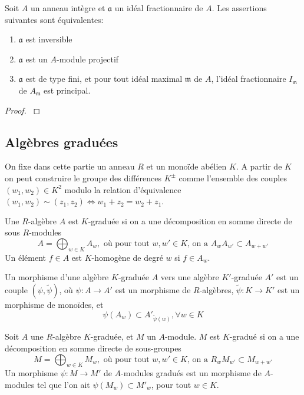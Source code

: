 \begin{thm}\label{ideauxinversibles}
Soit $A$ un anneau intègre et $\mathfrak{a}$ un idéal fractionnaire de $A$. Les assertions suivantes sont équivalentes:
\begin{enumerate}
\item $\mathfrak{a}$ est inversible
\item $\mathfrak{a}$ est un $A$-module projectif
\item $\mathfrak{a}$ est de type fini, et pour tout idéal maximal $\mathfrak{m}$ de $A$, l'idéal fractionnaire $I_\mathfrak{m}$ de $A_\mathfrak{m}$ est principal.
\end{enumerate}
\end{thm}
\begin{proof}
\cite[11.3]{Matsumura}
\end{proof}

\subsection{Algèbres graduées}

On fixe dans cette partie un anneau $R$ et un monoïde abélien $K$. A partir de $K$ on peut construire le groupe des différences $K^{\pm}$ comme l'ensemble des couples $(w_1,w_2)\in K^2$ modulo la relation d'équivalence $(w_1,w_2)\sim (z_1,z_2)\iff w_1+z_2=w_2+z_1$. 

\begin{defn}
Une $R$-algèbre $A$ est $K$-graduée si on a une décomposition en somme directe de sous $R$-modules 
$$A=\bigoplus_{w\in K}A_w,\text{ où pour tout } w,w'\in K\text{, on a }A_wA_{w'}\subset A_{w+w'}$$
Un élément $f\in A$ est $K$-homogène de degré $w$ si $f\in A_w$.

Un morphisme d'une algèbre $K$-graduée $A$ vers une algèbre $K'$-graduée $A'$ est un couple $(\psi,\widetilde{\psi})$, où $\psi:A\rightarrow A'$ est un morphisme de $R$-algèbres, $\widetilde{\psi}:K\rightarrow K'$ est un morphisme de monoïdes, et
$$\psi(A_w)\subset A'_{\widetilde{\psi}(w)}, \forall w\in K$$  
\end{defn}

\begin{defn}
Soit $A$ une $R$-algèbre $K$-graduée, et $M$ un $A$-module. $M$ est $K$-gradué si on a une décomposition en somme directe de sous-groupes
$$M=\bigoplus_{w\in K}M_w,\text{ où pour tout } w,w'\in K\text{, on a }R_wM_{w'}\subset M_{w+w'}$$
Un morphisme $\psi:M\rightarrow M'$ de $A$-modules gradués est un morphisme de $A$-modules tel que l'on ait $\psi(M_w)\subset M'_w$, pour tout $w\in K$.
\end{defn}

